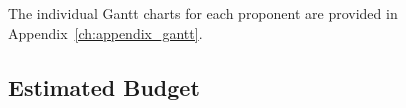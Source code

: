 


The individual Gantt charts for each proponent are provided in Appendix~\ref{ch:appendix_gantt}.

\subsection{Estimated Budget}

\FloatBarrier

